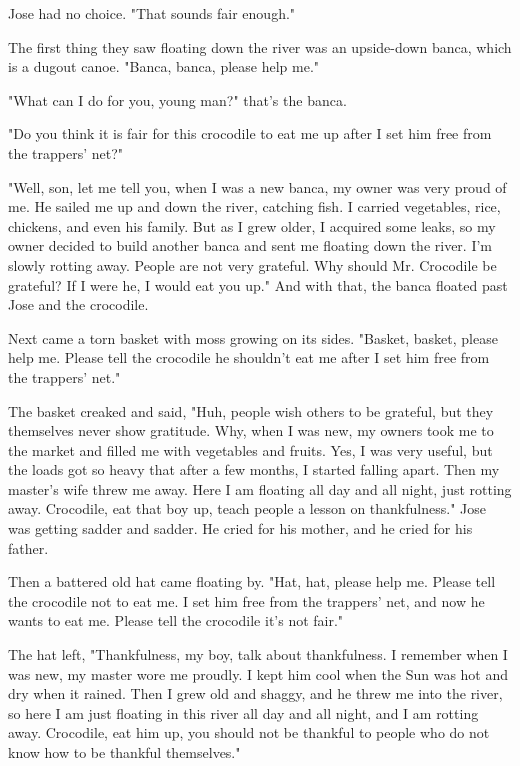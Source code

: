 Jose had no choice. "That sounds fair enough."

The first thing they saw floating down the river was an upside-down banca, which is a dugout canoe. "Banca, banca, please help me."

"What can I do for you, young man?" that's the banca.

"Do you think it is fair for this crocodile to eat me up after I set him free from the trappers' net?"

"Well, son, let me tell you, when I was a new banca, my owner was very proud of me. He sailed me up and down the river, catching fish. I carried vegetables, rice, chickens, and even his family. But as I grew older, I acquired some leaks, so my owner decided to build another banca and sent me floating down the river. I'm slowly rotting away. People are not very grateful. Why should Mr. Crocodile be grateful? If I were he, I would eat you up." And with that, the banca floated past Jose and the crocodile.

Next came a torn basket with moss growing on its sides. "Basket, basket, please help me. Please tell the crocodile he shouldn't eat me after I set him free from the trappers' net."

The basket creaked and said, "Huh, people wish others to be grateful, but they themselves never show gratitude. Why, when I was new, my owners took me to the market and filled me with vegetables and fruits. Yes, I was very useful, but the loads got so heavy that after a few months, I started falling apart. Then my master's wife threw me away. Here I am floating all day and all night, just rotting away. Crocodile, eat that boy up, teach people a lesson on thankfulness." Jose was getting sadder and sadder. He cried for his mother, and he cried for his father.

Then a battered old hat came floating by. "Hat, hat, please help me. Please tell the crocodile not to eat me. I set him free from the trappers' net, and now he wants to eat me. Please tell the crocodile it's not fair."

The hat left, "Thankfulness, my boy, talk about thankfulness. I remember when I was new, my master wore me proudly. I kept him cool when the Sun was hot and dry when it rained. Then I grew old and shaggy, and he threw me into the river, so here I am just floating in this river all day and all night, and I am rotting away. Crocodile, eat him up, you should not be thankful to people who do not know how to be thankful themselves."

